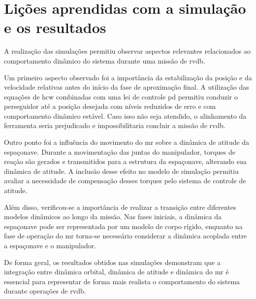 \section{Lições aprendidas com a simulação e os resultados}

A realização das simulações permitiu observar aspectos relevantes relacionados ao comportamento dinâmico do sistema durante uma missão de \gls{rvdb}.

Um primeiro aspecto observado foi a importância da estabilização da posição e da velocidade relativas antes do início da fase de aproximação final. 
A utilização das equações de \gls{hcw} combinadas com uma lei de controle \gls{pd} permitiu conduzir o perseguidor até a posição desejada com níveis reduzidos de erro e com comportamento dinâmico estável.
Caso isso não seja atendido, o alinhamento da ferramenta seria prejudicado e impossibilitaria concluir a missão de \gls{rvdb}.

Outro ponto foi a influência do movimento do \gls{mr} sobre a dinâmica de atitude da espaçonave. 
Durante a movimentação das juntas do manipulador, torques de reação são gerados e transmitidos para a estrutura da espaçonave, alterando sua dinâmica de atitude. 
A inclusão desse efeito no modelo de simulação permitiu avaliar a necessidade de compensação desses torques pelo sistema de controle de atitude.

Além disso, verificou-se a importância de realizar a transição entre diferentes modelos dinâmicos ao longo da missão. 
Nas fases iniciais, a dinâmica da espaçonave pode ser representada por um modelo de corpo rígido, enquanto na fase de operação do \gls{mr} torna-se necessário considerar a dinâmica acoplada entre a espaçonave e o manipulador.

De forma geral, os resultados obtidos nas simulações demonstram que a integração entre dinâmica orbital, dinâmica de atitude e dinâmica do \gls{mr} é essencial para representar de forma mais realista o comportamento do sistema durante operações de \gls{rvdb}.